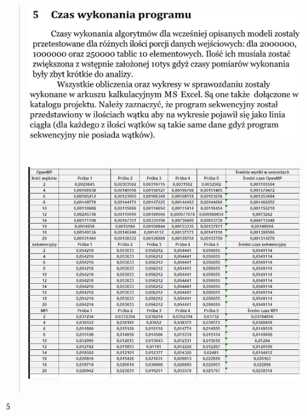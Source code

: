 \documentclass[
]{article}
\begin{document}
\begin{quote}
\includegraphics[width=5.06944in,height=2.47222in]{vertopal_45f5e71363bf454ba37a280ca069ec4b/media/image22.png}

\includegraphics[width=5.35972in,height=4.14167in]{vertopal_45f5e71363bf454ba37a280ca069ec4b/media/image23.png}
\end{quote}

\includegraphics[width=0.13889in,height=0.18056in]{vertopal_45f5e71363bf454ba37a280ca069ec4b/media/image24.png}
\end{document}
